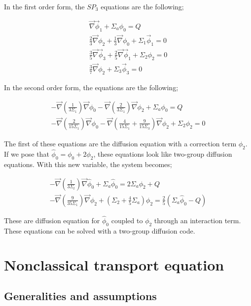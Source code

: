 \documentclass[a4paper, 12pt]{report}
\begin{document}
In the first order form, the $SP_3$ equations are the following;

\begin{align}
\vec{\nabla}\vec{\phi}_1 + \Sigma_a\phi_0 = Q \\
\frac{2}{3}\vec{\nabla}\phi_2 + \frac{1}{3}\vec{\nabla}\phi_0 + \Sigma_1 \vec{\phi}_1 = 0\\
\frac{3}{5}\vec{\nabla}\vec{\phi}_3+\frac{2}{5}\vec{\nabla}\vec{\phi}_1 + \Sigma_2 \phi_2 = 0\\
\frac{3}{7}\vec{\nabla}\phi_2 + \Sigma_3 \vec{\phi}_3 = 0
\end{align}

In the second order form, the equations are the following;

\begin{align}\label{eqsp3}
-\vec{\nabla}\left(\frac{1}{3\Sigma_1}\right)\vec{\nabla}\phi_0 -  \vec{\nabla}\left(\frac{2}{3\Sigma_1}\right)\vec{\nabla}\phi_2 + \Sigma_a \phi_0 = Q\\
-\vec{\nabla}\left(\frac{2}{15\Sigma_1}\right)\vec{\nabla}\phi_0 -  \vec{\nabla}\left(\frac{4}{15\Sigma_1}+\frac{9}{15\Sigma_3}\right)\vec{\nabla}\phi_2 + \Sigma_2 \phi_2 = 0
\end{align}

The first of these equations are the diffusion equation with a correction term $\phi_2$. If we pose that $\hat{\phi}_0 = \phi_0 + 2\phi_2$, these equations look like two-group diffusion equations. With this new variable, the system becomes;

\begin{align}
-\vec{\nabla}\left(\frac{1}{3\Sigma_t}\right)\vec{\nabla}\hat{\phi}_0  + \Sigma_a \hat{\phi}_0 = 2 \Sigma_a \phi_2 + Q\\
-\vec{\nabla}\left(\frac{9}{35\Sigma_1}\right)\vec{\nabla}\phi_2 +  \left(\Sigma_2+\frac{4}{5}\Sigma_a\right)\phi_2  = \frac{2}{5}\left(\Sigma_a\hat{\phi}_0 - Q\right)
\end{align}

These are diffusion equation for $\hat{\phi}_0$ coupled to $\phi_2$ through an interaction
term. These equations can be solved with a two-group diffusion code.

\chapter{Nonclassical transport equation}
\section{Generalities and assumptions}
\end{document}
